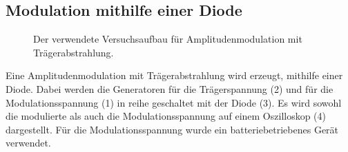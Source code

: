 \subsection{Modulation mithilfe einer Diode}
\begin{figure}[h!]
	\centering
			\caption{Der verwendete Versuchsaufbau für Amplitudenmodulation mit Trägerabstrahlung.}
\end{figure}
Eine Amplitudenmodulation mit Trägerabstrahlung wird erzeugt, mithilfe einer Diode. 
Dabei werden die Generatoren für die Trägerspannung (2) und für die Modulationsspannung (1) in reihe geschaltet mit der Diode (3).
Es wird sowohl die modulierte als auch die Modulationsspannung auf einem Oszilloskop (4) dargestellt.
Für die Modulationsspannung wurde ein batteriebetriebenes Gerät verwendet.
